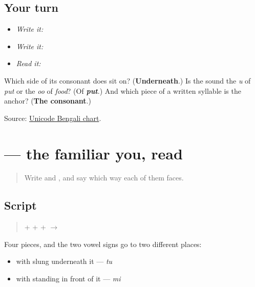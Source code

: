 \subsection*{Your turn}
\begin{itemize}
\raggedright
  \item \emph{Write it:} 
  \item \emph{Write it:} 
  \item \emph{Read it:} 
\end{itemize}

\begin{tcolorbox}[breakable,colback=teal!4,colframe=teal!35!black,title={Before you move on}]
Which side of its consonant does \textbf{} sit on? (\textbf{Underneath}.) Is the sound the \emph{u} of \emph{put} or the \emph{oo} of \emph{food}? (Of \emph{\textbf{put}}.) And which piece of a written syllable is the anchor? (\textbf{The consonant}.)

Source: \href{https://www.unicode.org/charts/PDF/U0980.pdf}{Unicode Bengali chart}.
\end{tcolorbox}
\section[tumi]{ — the familiar you, read}

\label{lesson:BN-W02-tumi-read}



\begin{quote}
Write \textbf{} and \textbf{}, and say which way each of them faces.
\end{quote}

\subsection*{Script}
\begin{quote}
\textbf{} + \textbf{} + \textbf{} + \textbf{} $\to$ \textbf{}
\end{quote}

Four pieces, and the two vowel signs go to two different places:

\begin{itemize}
\raggedright
  \item \textbf{} with \textbf{} slung underneath it — \emph{tu}
  \item \textbf{} with \textbf{} standing in front of it — \emph{mi}
\end{itemize}

